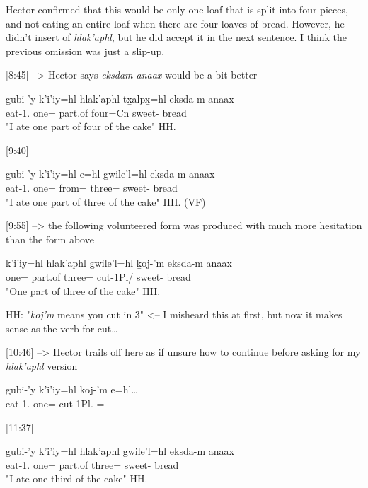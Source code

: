 Hector confirmed that this would be only one loaf that is split into four pieces, and not eating an entire loaf when there are four loaves of bread. However, he didn't insert of \textit{hlak'aphl}, but he did accept it in the next sentence. I think the previous omission was just a slip-up.

[8:45] --> Hector says \textit{eksdam anaax} would be a bit better
\begin{exe}
\ex \gll 
gubi-'y k'i'iy=hl hlak'aphl tx̱alpx̱=hl eksda-m anaax\\
eat-1.\Ii{} one=\Cn{} part.of four=Cn{} sweet-\Attr{} bread\\
\glt "I ate one part of four of the cake" \hfill HH.\ElicitationDate{}
\end{exe}

[9:40]
\begin{exe}
\ex \gll
gubi-'y k'i'iy=hl e=hl gwile'l=hl eksda-m anaax \\
eat-1.\Ii{} one=\Cn{} from=\Cn{} three=\Cn{} sweet-\Attr{} bread \\
\glt "I ate one part of three of the cake" \hfill HH.\ElicitationDate{} (VF)
\end{exe}

[9:55] --> the following volunteered form was produced with much more hesitation than the form above
\begin{exe}
\ex \gll 
k'i'iy=hl hlak'aphl gwile'l=hl ḵoj-'m eksda-m anaax \\
one=\Cn{} part.of three=\Cn{} cut-1Pl/\Ii{} sweet-\Attr{} bread \\
\glt "One part of three of the cake" \hfill HH.\ElicitationDate{}
\end{exe}

HH: "\textit{ḵoj'm} means you cut in 3" <-- I misheard this at first, but now it makes sense as the verb for cut\dots


[10:46] --> Hector trails off here as if unsure how to continue before asking for my \textit{hlak'aphl} version
\begin{exe}
\ex \gll 
gubi-'y k'i'iy=hl ḵoj-'m e=hl\dots \\
eat-1.\Ii{} one=\Cn{} cut-1Pl.\Ii{} \Prep=\Cn{}\\
\end{exe}

[11:37]
\begin{exe}
\ex \gll 
gubi-'y k'i'iy=hl hlak'aphl gwile'l=hl eksda-m anaax\\
eat-1.\Ii{} one=\Cn{} part.of three=\Cn{} sweet-\Attr{} bread\\
\glt "I ate one third of the cake" \hfill HH.\ElicitationDate{}
\end{exe}

